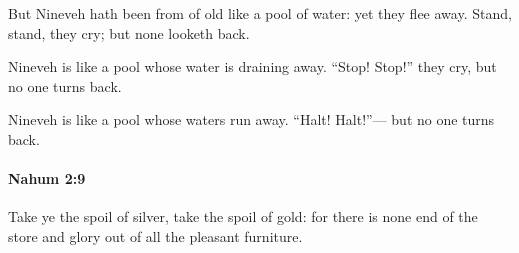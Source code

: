			\begin{versebox}
					\item[BHS] 
					\item[LXX] 
					\item[ASV] But Nineveh hath been from of old like a pool of water: yet they flee away. Stand, stand, they cry; but none looketh back.
					\item[NIV] Nineveh is like a pool whose water is draining away. “Stop! Stop!” they cry, but no one turns back.
					\item[NRSV] Nineveh is like a pool whose waters run away. “Halt! Halt!”— but no one turns back.
			\end{versebox}

		\paragraph{Nahum 2:9} %
			\label{NAHUM-2-9}

			Take ye the spoil of silver, take the spoil of gold: for there is none end of the store and glory out of all the pleasant furniture.


